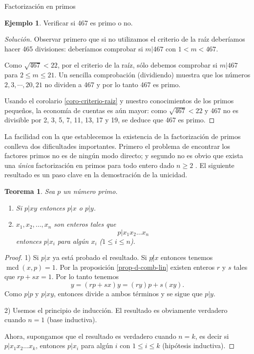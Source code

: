 \documentclass[11pt,spanish,makeidx]{amsbook}
\newtheorem{teorema}{Teorema}[section]
\theoremstyle{definition}
\newtheorem{ejemplo}{Ejemplo}[section]
\theoremstyle{remark}
\newcommand \mcd{\operatorname{mcd}}
\begin{document}
\begin{section}{Factorización en primos}
\begin{ejemplo} Verificar si 467 es primo o no.
\begin{proof}[Solución]
	 Observar primero que si no utilizamos el criterio de la raíz deberíamos hacer 465 divisiones: deberíamos comprobar si $m|467$ con  $1<m <467$. 
	
	Como $\sqrt{467} < 22$, por el criterio de la raíz, sólo debemos comprobar si $m|467$ para $2\le m \le 21$. Un sencilla comprobación (dividiendo) muestra que los números $2,3,\cdots,20,21$ no  dividen a 467 y por  lo tanto 467 es primo.
	
	Usando el corolario \ref{coro-criterio-raiz} y nuestro conocimientos de los primos pequeños,  la economía de cuentas es aún mayor: como $\sqrt{467} < 22$ y 467 no es divisible por 2, 3, 5, 7, 11, 13, 17 y 19, se deduce que 467 es primo. 
\end{proof}
\end{ejemplo}

La facilidad con la que establecemos la existencia de la factorización de primos conlleva dos dificultades importantes. Primero el problema de encontrar los factores primos no es de ningún modo directo; y segundo no es obvio que exista una {\it única} factorización en primos para todo entero dado $n\ge 2$ . El siguiente resultado es un paso clave en la demostración de la unicidad.

\begin{teorema}\label{t1.8} Sea $p$  un número  primo.

\begin{enumerate} 
\item Si $p|xy$ entonces $p|x$ o $p|y$.
\item $x_1,x_2,\ldots,x_n$ son enteros tales que
$$
p|x_1x_2\ldots x_n
$$
entonces $p|x_i$ para algún $x_i$ ($1\le i \le n$).
\end{enumerate}
\end{teorema}
\begin{proof} 1)  Si $p|x$ ya está probado el resultado. Si $p{{\not|}}x$ entonces tenemos $\mcd(x,p)=1$. Por la proposición \ref{prop-d-comb-lin} existen enteros $r$ y $s$ tales que $rp+sx=1$. Por lo tanto tenemos
$$
y =(rp+sx)y =(ry)p+s(xy).
$$
Como $p|p$ y $p|xy$, entonces divide a ambos términos y se sigue que $p|y$. 

2) Usemos el principio de inducción. El resultado es obviamente verdadero cuando $n=1$ (base inductiva). 

Ahora, supongamos que el resultado es verdadero cuando $n=k$, es decir si $p|x_1x_2\ldots x_k$, entonces  $p|x_i$ para algún $i$ con $1\le i \le k$ (hipótesis inductiva).


\end{proof}
\end{section}
\end{document}
